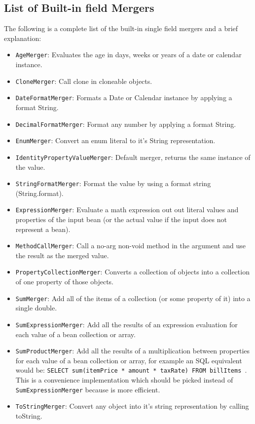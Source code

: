 \documentclass[11pt]{article}
\begin{document}
\subsection{List of Built-in field Mergers}


The following is a complete list of the built-in single field mergers and a brief explanation:

\begin{itemize}
 \item \texttt{AgeMerger}: Evaluates the age in days, weeks or years of a date or calendar instance.
 \item \texttt{CloneMerger}: Call clone in cloneable objects.
 \item \texttt{DateFormatMerger}: Formats a Date or Calendar instance by applying a format String.
 \item \texttt{DecimalFormatMerger}: Format any number by applying a format String.
 \item \texttt{EnumMerger}: Convert an enum literal to it's String representation.
 \item \texttt{IdentityPropertyValueMerger}: Default merger, returns the same instance of the value.
 \item \texttt{StringFormatMerger}: Format the value by using a format string (String.format).
 \item \texttt{ExpressionMerger}: Evaluate a math expression out out literal values and properties of the input bean (or the actual value if the input does not represent a bean).
 \item \texttt{MethodCallMerger}: Call a no-arg non-void method in the argument and use the result as the merged value.
 \item \texttt{PropertyCollectionMerger}: Converts a collection of objects into a collection of one property of those objects.
 \item \texttt{SumMerger}: Add all of the items of a collection (or some property of it) into a single double.
 \item \texttt{SumExpressionMerger}: Add all the results of an expression evaluation for each value of a bean collection or array.
 \item \texttt{SumProductMerger}: Add all the results of a multiplication between properties for each value of a bean collection or array, for example an SQL equivalent would be: \texttt{SELECT sum(itemPrice * amount * taxRate) FROM billItems }. This is a convenience implementation which should be picked instead of \texttt{SumExpressionMerger} because is more efficient.
 \item \texttt{ToStringMerger}: Convert any object into it's string representation by calling toString.
\end{itemize}
\end{document}
